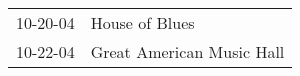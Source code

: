 \begin{supertabular}{p{0.25\columnwidth}p{0.75\columnwidth}}
 10-20-04 &             House of Blues \\
 10-22-04 &  Great American Music Hall \\
\end{supertabular}

